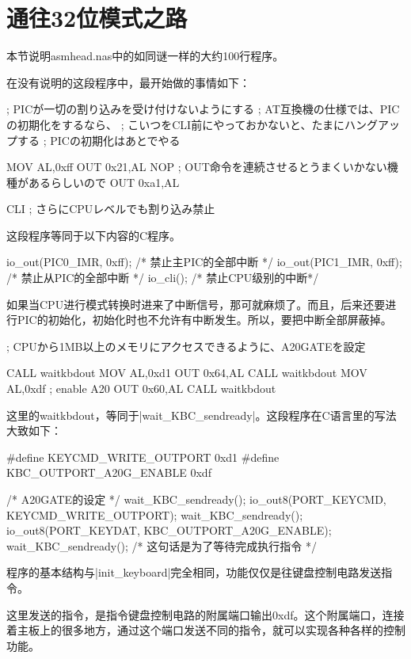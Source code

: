\section{	通往32位模式之路	}
本节说明asmhead.nas中的如同谜一样的大约100行程序。

在没有说明的这段程序中，最开始做的事情如下：

\begin{code}[label=asmhead.nas节选]
; PICが一切の割り込みを受け付けないようにする
;	AT互換機の仕様では、PICの初期化をするなら、
;	こいつをCLI前にやっておかないと、たまにハングアップする
;	PICの初期化はあとでやる

		MOV		AL,0xff
		OUT		0x21,AL
		NOP						; OUT命令を連続させるとうまくいかない機種があるらしいので
		OUT		0xa1,AL

		CLI						; さらにCPUレベルでも割り込み禁止
\end{code}

这段程序等同于以下内容的C程序。
\begin{code}
io_out(PIC0_IMR, 0xff); /* 禁止主PIC的全部中断 */
io_out(PIC1_IMR, 0xff); /* 禁止从PIC的全部中断 */
io_cli(); /* 禁止CPU级别的中断*/
\end{code}

如果当CPU进行模式转换时进来了中断信号，那可就麻烦了。而且，后来还要进行PIC的初始化，初始化时也不允许有中断发生。所以，要把中断全部屏蔽掉。

\cs

\begin{code}[label=asmhead.nas节选（续）]
; CPUから1MB以上のメモリにアクセスできるように、A20GATEを設定

		CALL	waitkbdout
		MOV		AL,0xd1
		OUT		0x64,AL
		CALL	waitkbdout
		MOV		AL,0xdf			; enable A20
		OUT		0x60,AL
		CALL	waitkbdout
\end{code}

这里的waitkbdout，等同于|wait_KBC_sendready|。这段程序在C语言里的写法大致如下：
\begin{code}
#define KEYCMD_WRITE_OUTPORT    0xd1
#define KBC_OUTPORT_A20G_ENABLE 0xdf

    /* A20GATE的设定 */
    wait_KBC_sendready();
    io_out8(PORT_KEYCMD, KEYCMD_WRITE_OUTPORT);
    wait_KBC_sendready();
    io_out8(PORT_KEYDAT, KBC_OUTPORT_A20G_ENABLE);
    wait_KBC_sendready(); /* 这句话是为了等待完成执行指令 */
\end{code}


程序的基本结构与|init_keyboard|完全相同，功能仅仅是往键盘控制电路发送指令。

这里发送的指令，是指令键盘控制电路的附属端口输出0xdf。这个附属端口，连接着主板上的很多地方，通过这个端口发送不同的指令，就可以实现各种各样的控制功能。

